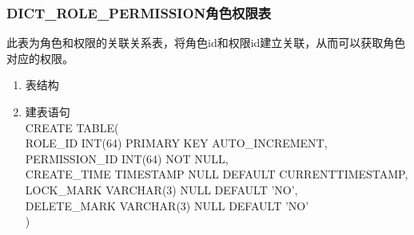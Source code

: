 \subsubsection{DICT\_ROLE\_PERMISSION角色权限表}
此表为角色和权限的关联关系表，将角色id和权限id建立关联，从而可以获取角色对应的权限。
\begin{enumerate}
    \item 表结构
    \begin{table}[htbp]
        \centering
        \end{table}
    \item 建表语句\\
        CREATE TABLE(\\
            ROLE\_ID INT(64) PRIMARY KEY AUTO\_INCREMENT,\\
            PERMISSION\_ID INT(64) NOT NULL, \\
            CREATE\_TIME TIMESTAMP NULL DEFAULT CURRENTTIMESTAMP,\\
            LOCK\_MARK VARCHAR(3) NULL DEFAULT 'NO', \\            
            DELETE\_MARK VARCHAR(3) NULL DEFAULT 'NO'\\
        )
    \end{enumerate}

